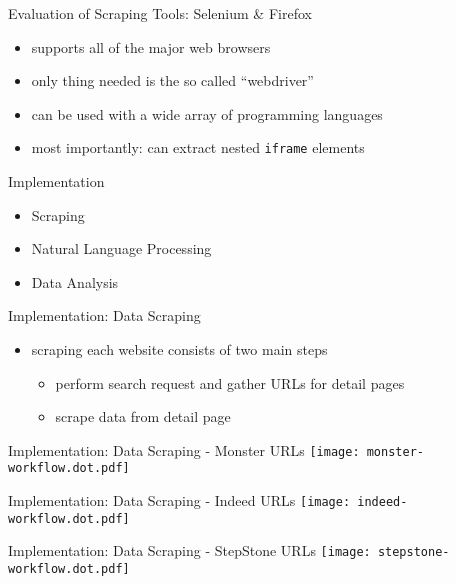 \documentclass[aspectratio=169]{beamer}
\begin{document}
  \begin{frame}{Evaluation of Scraping Tools: Selenium \& Firefox}
    \begin{itemize}
      \item supports all of the major web browsers
      \item only thing needed is the so called “webdriver”
      \item can be used with a wide array of programming languages
      \item most importantly: can extract nested \texttt{iframe} elements
    \end{itemize}
  \end{frame}

  \begin{frame}{Implementation}
    \begin{itemize}
      \item Scraping
      \item Natural Language Processing
      \item Data Analysis
    \end{itemize}
  \end{frame}

  \begin{frame}{Implementation: Data Scraping}
    \begin{itemize}
      \item scraping each website consists of two main steps
        \begin{itemize}
          \item perform search request and gather URLs for detail pages
          \item scrape data from detail page
        \end{itemize}
    \end{itemize}
  \end{frame}

  \begin{frame}{Implementation: Data Scraping - Monster URLs}
    \centering
    \texttt{[image: monster-workflow.dot.pdf]}
  \end{frame}

  \begin{frame}{Implementation: Data Scraping - Indeed URLs}
    \centering
    \texttt{[image: indeed-workflow.dot.pdf]}
  \end{frame}

  \begin{frame}{Implementation: Data Scraping - StepStone URLs}
    \centering
    \texttt{[image: stepstone-workflow.dot.pdf]}
  \end{frame}
\end{document}
